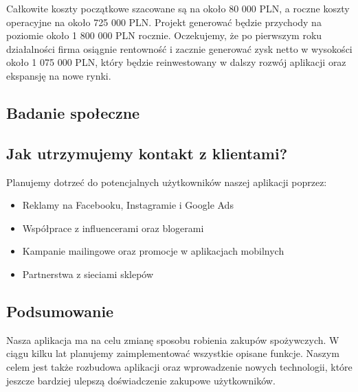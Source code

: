 \documentclass[12pt,a4paper]{article}
\begin{document}
Całkowite koszty początkowe szacowane są na około 80 000 PLN, a roczne koszty operacyjne na około 725 000 PLN. Projekt generować będzie przychody na poziomie około 1 800 000 PLN rocznie. Oczekujemy, że po pierwszym roku działalności firma osiągnie rentowność i zacznie generować zysk netto w wysokości około 1 075 000 PLN, który będzie reinwestowany w dalszy rozwój aplikacji oraz ekspansję na nowe rynki.

\subsection*{Badanie społeczne}

\subsection*{Jak utrzymujemy kontakt z klientami?}

Planujemy dotrzeć do potencjalnych użytkowników naszej aplikacji poprzez:
\begin{itemize}
    \item Reklamy na Facebooku, Instagramie i Google Ads
    \item Współprace z influencerami oraz blogerami
    \item Kampanie mailingowe oraz promocje w aplikacjach mobilnych
    \item Partnerstwa z sieciami sklepów
\end{itemize}

\subsection*{Podsumowanie}

Nasza aplikacja ma na celu zmianę sposobu robienia zakupów spożywczych.
W ciągu kilku lat planujemy zaimplementować wszystkie opisane funkcje.
Naszym celem jest także rozbudowa aplikacji oraz wprowadzenie nowych technologii,
które jeszcze bardziej ulepszą doświadczenie zakupowe użytkowników.
\end{document}
